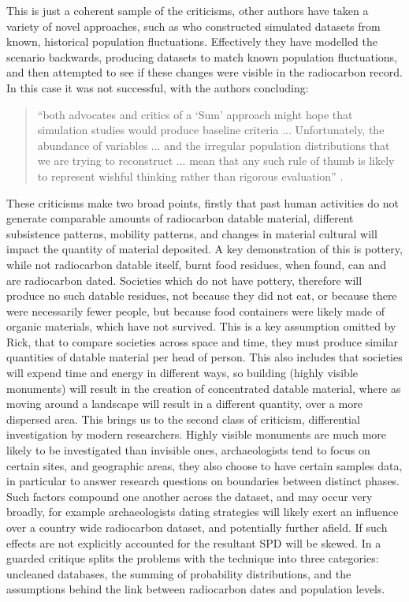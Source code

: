 This is just a coherent sample of the criticisms, other authors have taken a variety of novel approaches, such as \citet{CONTRERAS2014591} who constructed simulated datasets from known, historical population fluctuations. Effectively they have modelled the scenario backwards, producing datasets to match known population fluctuations, and then attempted to see if these changes were visible in the radiocarbon record. In this case it was not successful, with the authors concluding: \begin{quote}``both advocates and critics of a `Sum' approach might hope that simulation studies would produce baseline criteria ... Unfortunately, the abundance of variables ... and the irregular population distributions that we are trying to reconstruct ... mean that any such rule of thumb is likely to represent wishful thinking rather than rigorous evaluation'' \citep[605]{CONTRERAS2014591}.\end{quote}

These criticisms make two broad points, firstly that past human activities do not generate comparable amounts of radiocarbon datable material, different subsistence patterns, mobility patterns, and changes in material cultural will impact the quantity of material deposited. A key demonstration of this is pottery, while not radiocarbon datable itself, burnt food residues, when found, can and are radiocarbon dated. Societies which do not have pottery, therefore will produce no such datable residues, not because they did not eat, or because there were necessarily fewer people, but because food containers were likely made of organic materials, which have not survived. This is a key assumption omitted by Rick, that to compare societies across space and time, they must produce similar quantities of datable material per head of person. This also includes that societies will expend time and energy in different ways, so building (highly visible monuments) will result in the creation of concentrated datable material, where as moving around a landscape will result in a different quantity, over a more dispersed area. This brings us to the second class of criticism, differential investigation by modern researchers. Highly visible monuments are much more likely to be investigated than invisible ones, archaeologists tend to focus on certain sites, and geographic areas, they also choose to have certain samples data, in particular to answer research questions on boundaries between distinct phases. Such factors compound one another across the dataset, and may occur very broadly, for example archaeologists dating strategies will likely exert an influence over a country wide radiocarbon dataset, and potentially further afield. If such effects are not explicitly accounted for the resultant SPD will be skewed. In a guarded critique \citet{whittle2018times} splits the problems with the technique into three categories: uncleaned databases, the summing of probability distributions, and the assumptions behind the link between radiocarbon dates and population levels.
 
